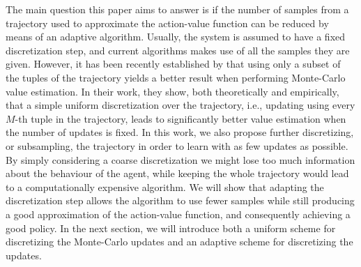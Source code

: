 The main question this paper aims to answer is if the number of samples from a trajectory used to approximate the action-value function can be reduced by means of an adaptive algorithm. Usually, the system is assumed to have a fixed discretization step, and current algorithms makes use of all the samples they are given. However, it has been recently established by \cite{zhang2024managing} that using only a subset of the tuples of the trajectory yields a better result when performing Monte-Carlo value estimation. In their work, they show, both theoretically and empirically, that a simple uniform discretization over the trajectory, i.e., updating using every $M$-th tuple in the trajectory, leads to significantly better value estimation when the number of updates is fixed. In this work, we also propose further discretizing, or subsampling, the trajectory in order to learn with as few updates as possible. By simply considering a coarse discretization we might lose too much information about the behaviour of the agent, while keeping the whole trajectory would lead to a computationally expensive algorithm. We will show that adapting the discretization step allows the algorithm to use fewer samples while still producing a good approximation of the action-value function, and consequently achieving a good policy. In the next section, we will introduce both a uniform scheme for discretizing the Monte-Carlo updates and an adaptive scheme for discretizing the updates.



